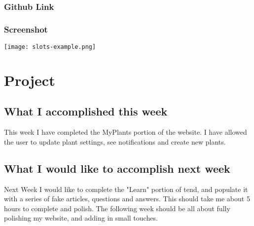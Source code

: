 \documentclass[portfolio.tex]{subfiles}
\begin{document}
	\subsubsection{Github Link}

	\subsubsection{Screenshot}

	\begin{center}
		\texttt{[image: slots-example.png]}
	\end{center}

	\section{Project}
	\subsection{What I accomplished this week}
		This week I have completed the MyPlants portion of the website. I have allowed the user to update plant settings, see notifications and create new plants.

	\subsection{What I would like to accomplish next week}
		Next Week I would like to complete the "Learn" portion of tend, and populate it with a series of fake articles, questions and answers. This should take me about 5 hours to complete and polish. The following week should be all about fully polishing my website, and adding in small touches.

\pagebreak
\end{document}
